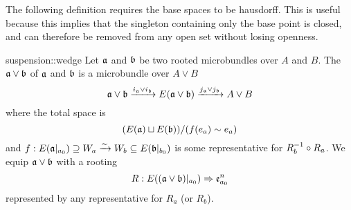 \begin{myparagraph}
    The following definition requires the base spaces to be hausdorff.
    This is useful because this implies that the singleton containing only the base point is closed,
    and can therefore be removed from any open set without losing openness.  
\end{myparagraph}

\begin{mydefinition}{suspension::wedge}
    Let $\mathfrak{a}$ and $\mathfrak{b}$ be two rooted microbundles over $A$ and $B$.
    The  $\mathfrak{a} \vee \mathfrak{b}$ of $\mathfrak{a}$ and $\mathfrak{b}$ is a microbundle over $A \vee B$
    \[ \mathfrak{a} \vee \mathfrak{b} \xrightarrow{i_{\mathfrak{a}} \vee i_{\mathfrak{b}}} E(\mathfrak{a} \vee \mathfrak{b}) \xrightarrow{j_{\mathfrak{a}} \vee j_{\mathfrak{b}}} A \vee B \]
    where the total space is
    \[ (E(\mathfrak{a}) \sqcup E(\mathfrak{b})) / (f(e_a) \sim e_a) \]
    and $f: E(\mathfrak{a}\vert_{a_0}) \supseteq{} W_a \xrightarrow{\sim} W_b \subseteq{} E(\mathfrak{b}\vert_{b_0})$ is some representative for $R_b^{-1} \circ R_a$.
    We equip $\mathfrak{a} \vee \mathfrak{b}$ with a rooting
    \[ R: E((\mathfrak{a} \vee \mathfrak{b})\vert_{a_0}) \Rightarrow{} \mathfrak{e}^{n}_{a_0} \]
    represented by any representative for $R_a$ (or $R_b$).
\end{mydefinition}

